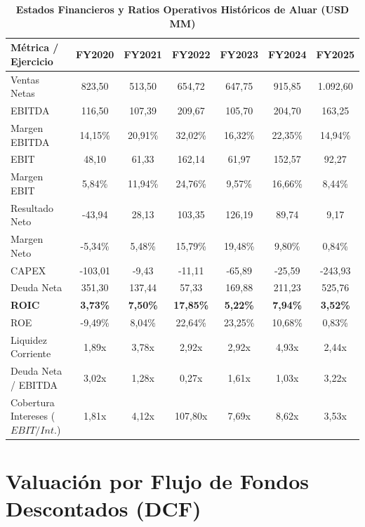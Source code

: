\documentclass[10pt,a4paper]{article}
\begin{document}
\begin{table}[H]
\centering
\caption{\textbf{Estados Financieros y Ratios Operativos Históricos de Aluar (USD MM)}}
\scriptsize
\begin{tabularx}{\textwidth}{Xcccccc}
\toprule
\textbf{Métrica / Ejercicio} & \textbf{FY2020} & \textbf{FY2021} & \textbf{FY2022} & \textbf{FY2023} & \textbf{FY2024} & \textbf{FY2025} \\
\midrule
Ventas Netas & 823,50 & 513,50 & 654,72 & 647,75 & 915,85 & 1.092,60 \\
EBITDA & 116,50 & 107,39 & 209,67 & 105,70 & 204,70 & 163,25 \\
Margen EBITDA & 14,15\% & 20,91\% & 32,02\% & 16,32\% & 22,35\% & 14,94\% \\
EBIT & 48,10 & 61,33 & 162,14 & 61,97 & 152,57 & 92,27 \\
Margen EBIT & 5,84\% & 11,94\% & 24,76\% & 9,57\% & 16,66\% & 8,44\% \\
Resultado Neto & -43,94 & 28,13 & 103,35 & 126,19 & 89,74 & 9,17 \\
Margen Neto & -5,34\% & 5,48\% & 15,79\% & 19,48\% & 9,80\% & 0,84\% \\
CAPEX & -103,01 & -9,43 & -11,11 & -65,89 & -25,59 & -243,93 \\
Deuda Neta & 351,30 & 137,44 & 57,33 & 169,88 & 211,23 & 525,76 \\
\midrule
\textbf{ROIC} & \textbf{3,73\%} & \textbf{7,50\%} & \textbf{17,85\%} & \textbf{5,22\%} & \textbf{7,94\%} & \textbf{3,52\%} \\
ROE & -9,49\% & 8,04\% & 22,64\% & 23,25\% & 10,68\% & 0,83\% \\
Liquidez Corriente & 1,89x & 3,78x & 2,92x & 2,92x & 4,93x & 2,44x \\
Deuda Neta / EBITDA & 3,02x & 1,28x & 0,27x & 1,61x & 1,03x & 3,22x \\
Cobertura Intereses ($EBIT/Int.$) & 1,81x & 4,12x & 107,80x & 7,69x & 8,62x & 3,53x \\
\bottomrule
\end{tabularx}
\end{table}

\section{Valuación por Flujo de Fondos Descontados (DCF)}
\end{document}
